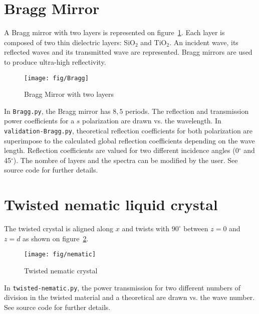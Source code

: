 \section{Bragg Mirror}
A Bragg mirror with two layers is represented on figure~\ref{fig:Bragg}. Each layer is composed of two thin dielectric layers: SiO$_2$ and TiO$_2$. An incident wave, its reflected waves and its transmitted wave are represented. Bragg mirrors are used to produce ultra-high reflectivity.
\begin{figure}[H]
\texttt{[image: fig/Bragg]}
\caption{\label{fig:Bragg}Bragg Mirror with two layers}
\end{figure}
In \verb/Bragg.py/, the Bragg mirror has $8,5$ periods. The reflection and transmission power coefficients for a $s$ polarization are drawn vs. the wavelength. In \verb/validation-Bragg.py/, theoretical reflection coefficients for both polarization are superimpose to the calculated global reflection coefficients depending on the wave length. Reflection coefficients are valued for two different incidence angles (0$^\circ$ and 45$^\circ$). The nombre of layers and the spectra can be modified by the user. See source code for further details.

\section{Twisted nematic liquid crystal}
The twisted crystal is aligned along $x$ and twists with  $90^\circ$ between $z=0$ and $z=d$ as shown on figure~\ref{fig:nematic}.
\begin{figure}[H]
\begin{center}
\texttt{[image: fig/nematic]}
\caption{\label{fig:nematic} Twisted nematic crystal}
\end{center}
\end{figure}
In \verb/twisted-nematic.py/, the power transmission for two different numbers of division in the twisted material and a theoretical are drawn vs. the wave number. See source code for further details. 
 
